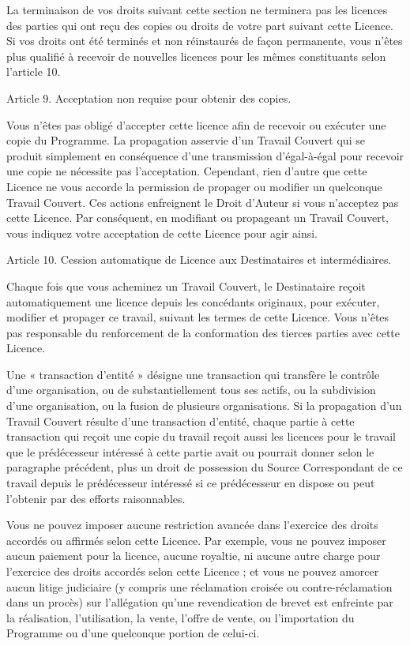 {La terminaison de vos droits suivant cette section ne terminera pas les
licences des parties qui ont reçu des copies ou droits de votre part
suivant cette Licence. Si vos droits ont été terminés et non
réinstaurés de façon permanente, vous n’êtes plus qualifié à recevoir
de nouvelles licences pour les mêmes constituants selon l’article 10.


Article 9. Acceptation non requise pour obtenir des copies.

Vous n’êtes pas obligé d’accepter cette licence afin de recevoir ou
exécuter une copie du Programme. La propagation asservie d’un Travail
Couvert qui se produit simplement en conséquence d’une transmission
d’égal-à-égal pour recevoir une copie ne nécessite pas l’acceptation.
Cependant, rien d’autre que cette Licence ne vous accorde la
permission de propager ou modifier un quelconque Travail Couvert. Ces
actions enfreignent le Droit d’Auteur si vous n’acceptez pas cette
Licence. Par conséquent, en modifiant ou propageant un Travail Couvert,
vous indiquez votre acceptation de cette Licence pour agir ainsi.


Article 10. Cession automatique de Licence aux Destinataires et
intermédiaires.

Chaque fois que vous acheminez un Travail Couvert, le Destinataire
reçoit automatiquement une licence depuis les concédants originaux,
pour exécuter, modifier et propager ce travail, suivant les termes de
cette Licence. Vous n’êtes pas responsable du renforcement de la
conformation des tierces parties avec cette Licence.

Une « transaction d’entité » désigne une transaction qui transfère le
contrôle d’une organisation, ou de substantiellement tous ses actifs,
ou la subdivision d’une organisation, ou la fusion de plusieurs
organisations. Si la propagation d’un Travail Couvert résulte d’une
transaction d’entité, chaque partie à cette transaction qui reçoit une
copie du travail reçoit aussi les licences pour le travail que le
prédécesseur intéressé à cette partie avait ou pourrait donner selon le
paragraphe précédent, plus un droit de possession du Source
Correspondant de ce travail depuis le prédécesseur intéressé si ce
prédécesseur en dispose ou peut l’obtenir par des efforts raisonnables.

Vous ne pouvez imposer aucune restriction avancée dans l’exercice des
droits accordés ou affirmés selon cette Licence. Par exemple, vous ne
pouvez imposer aucun paiement pour la licence, aucune royaltie, ni
aucune autre charge pour l’exercice des droits accordés selon cette
Licence ; et vous ne pouvez amorcer aucun litige judiciaire (y compris
une réclamation croisée ou contre-réclamation dans un procès) sur
l’allégation qu’une revendication de brevet est enfreinte par la
réalisation, l’utilisation, la vente, l’offre de vente, ou
l’importation du Programme ou d’une quelconque portion de celui-ci.


}
